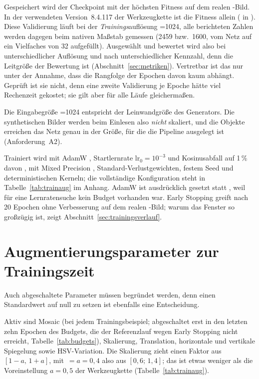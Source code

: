  Gespeichert wird der Checkpoint mit der höchsten
Fitness auf dem realen -Bild. In der verwendeten Version~8.4.117 der
Werkzeugkette ist die Fitness allein \mAPall{} ( in
). Diese Validierung läuft bei der
\emph{Trainings}auflösung =1024, alle berichteten Zahlen werden
dagegen beim nativen Maßstab gemessen (2459 bzw.\ 1600\px, vom Netz auf ein
Vielfaches von 32 aufgefüllt). Ausgewählt und bewertet wird also bei
unterschiedlicher Auflösung und nach unterschiedlicher Kennzahl, denn die
Leitgröße der Bewertung ist \mAPfifty{} (Abschnitt~\ref{sec:metriken}).
Vertretbar ist das nur unter der Annahme, dass die Rangfolge der Epochen davon
kaum abhängt. Geprüft ist sie nicht, denn eine zweite Validierung je Epoche
hätte viel Rechenzeit gekostet; sie gilt aber für alle Läufe gleichermaßen.

 Die Eingabegröße =1024 entspricht der
Leinwandgröße des Generators. Die synthetischen Bilder werden beim Einlesen also
\emph{nicht} skaliert, und die Objekte erreichen das Netz genau in der Größe,
für die die Pipeline ausgelegt ist (Anforderung~A2).

 Trainiert wird mit AdamW \parencite{loshchilov2019},
Startlernrate $\text{lr}_0 = 10^{-3}$ und Kosinusabfall auf 1\,\% davon
\parencite{loshchilov2017sgdr}, mit Mixed Precision \parencite{micikevicius2018},
Standard-Verlustgewichten, festem Seed und deterministischen Kerneln; die
vollständige Konfiguration steht in Tabelle~\ref{tab:trainaug} im Anhang. AdamW
ist ausdrücklich gesetzt statt , weil für eine Lernratensuche kein
Budget vorhanden war. Early Stopping greift nach 20 Epochen ohne Verbesserung
auf dem realen -Bild; warum das Fenster so großzügig ist, zeigt
Abschnitt~\ref{sec:trainingsverlauf}.

\section{Augmentierungsparameter zur Trainingszeit}
\label{sec:trainparam}

Auch abgeschaltete Parameter müssen begründet werden, denn einen Standardwert
auf null zu setzen ist ebenfalls eine Entscheidung.

Aktiv sind Mosaic (bei jedem Trainingsbeispiel; abgeschaltet erst in den
letzten zehn Epochen des Budgets, die der Referenzlauf wegen Early Stopping
nicht erreicht, Tabelle~\ref{tab:budgets}),
Skalierung, Translation, horizontale und vertikale Spiegelung sowie
HSV-Variation. Die Skalierung zieht einen Faktor aus $[1-a,\,1+a]$, mit
$\,=a=0{,}4$ also aus $[0{,}6;\,1{,}4]$; das ist etwas weniger als
die Voreinstellung $a=0{,}5$ der Werkzeugkette (Tabelle~\ref{tab:trainaug}).

